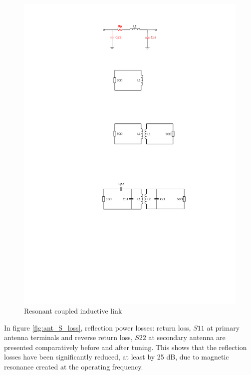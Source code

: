 \documentclass[UKenglish]{ifimaster}  %
\begin{document}
\begin{figure}[!htbp] %
   \centering
   \includegraphics[width=\textwidth]{img/ant_couple_resonant.pdf} 
   \caption{Resonant coupled inductive link}
   \label{fig:ant_couple_resonant}
\end{figure}

In figure \ref{fig:ant_S_loss}, reflection power losses:  return loss, $S11$ at primary antenna terminals and reverse return loss, $S22$ at secondary antenna are presented comparatively before and after tuning. This shows that the reflection losses have been significantly reduced, at least by 25 dB, due to magnetic resonance created at the operating frequency. \\
\end{document}
